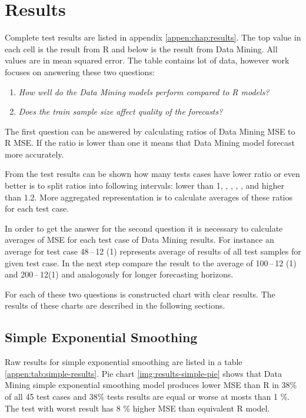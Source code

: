     \section{Results}
    Complete test results are listed in appendix \ref{appen:chap:results}. The top value in each cell is the result
    from R and below is the result from Data Mining. All values are in mean squared error. The table contains lot of
    data, however work focuses on answering these two questions:

    \begin{enumerate}
        \item \emph{How well do the Data Mining models perform compared to R models?} \label{itm:question2}
        \item \emph{Does the train sample size affect quality of the forecasts?} \label{itm:question1}
    \end{enumerate}

    The first question can be answered by calculating ratios of Data Mining MSE to R MSE. If the ratio is lower than
    one it means that Data Mining model forecast more accurately.

    From the test results can be shown how many tests cases have lower ratio or even better is to split ratios into
    following intervals:
    lower than 1, \interval[{1,1.01}], \interval[{1.01,1.05}], \interval[{1.05,1.10}], \interval[{1.1,1.2}],
    and higher than 1.2. More aggregated representation is to calculate averages of these ratios for each test case.

    In order to get the answer for the second question it is necessary to calculate averages of MSE for each test case
    of Data Mining results. For instance an average for test case 48\,--\,12 (1) represents average of results of all
    test samples for given test case. In the next step compare the result to the average of 100\,--\,12 (1)
    and 200\,--\,12(1) and analogously for longer forecasting horizons.

    For each of these two questions is constructed chart with clear results. The results of these charts are
    described in the following sections.

        \subsection{Simple Exponential Smoothing} \label{sec:results-simple}
        Raw results for simple exponential smoothing are listed in a table \ref{appen:tab:simple-results}.
        Pie chart \ref{img:results-simple-pie} shows that Data Mining simple exponential smoothing model produces
        lower MSE than R in 38\% of all 45 test cases and 38\% tests results are equal or worse at mosts than 1 \%.
        The test with worst result has 8 \% higher MSE than equivalent R model.

